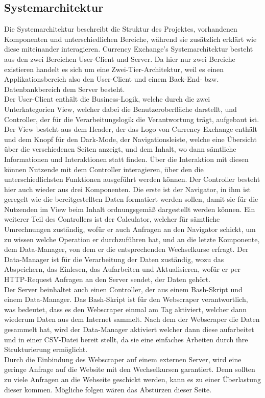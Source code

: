 \documentclass[conference]{IEEEtran}
\begin{document}
\subsection{Systemarchitektur}
Die Systemarchitektur beschreibt die Struktur des Projektes, vorhandenen Komponenten und unterschiedlichen Bereiche, während sie zusätzlich erklärt wie diese miteinander interagieren. 
Currency Exchange’s Systemarchitektur besteht aus den zwei Bereichen User-Client und Server. Da hier nur zwei Bereiche existieren handelt es sich um eine Zwei-Tier-Architektur, weil es einen Applikationsbereich also den User-Client und einem Back-End- bzw. Datenbankbereich dem Server besteht.\\
Der User-Client enthält die Business-Logik, welche durch die zwei Unterkategorien View, welcher dabei die Benutzeroberfläche darstellt, und Controller, der für die Verarbeitungslogik die Verantwortung trägt, aufgebaut ist. Der View besteht aus dem Header, der das Logo von Currency Exchange enthält und dem Knopf für den Dark-Mode, der Navigationsleiste, welche eine Übersicht über die verschiedenen Seiten anzeigt, und dem Inhalt, wo dann sämtliche Informationen und Interaktionen statt finden. Über die Interaktion mit diesen können Nutzende mit dem Controller interagieren, über den die unterschiedlichsten Funktionen ausgeführt werden können. Der Controller besteht hier auch wieder aus drei Komponenten. Die erste ist der Navigator, in ihm ist geregelt wie die bereitgestellten Daten formatiert werden sollen, damit sie für die Nutzenden im View beim Inhalt ordnungsgemäß dargestellt werden können. Ein weiterer Teil des Controllers ist der Calculator, welcher für sämtliche Umrechnungen zuständig, wofür er auch Anfragen an den Navigator schickt, um zu wissen welche Operation er durchzuführen hat, und an die letzte Komponente, dem Data-Manager, von dem er die entsprechenden Wechselkurse erfragt. Der Data-Manager ist für die Verarbeitung der Daten zuständig, wozu das Abspeichern, das Einlesen, das Aufarbeiten und Aktualisieren, wofür er per HTTP-Request Anfragen an den Server sendet, der Daten gehört.\\
Der Server beinhaltet auch einen Controller, der aus einem Bash-Skript und einem Data-Manager. Das Bash-Skript ist für den Webscraper verantwortlich, was bedeutet, dass es den Webscraper einmal am Tag aktiviert, welcher dann wiederum Daten aus dem Internet sammelt. Nach dem der Webscraper die Daten gesammelt hat, wird der Data-Manager aktiviert welcher dann diese aufarbeitet und in einer CSV-Datei bereit stellt, da sie eine einfaches Arbeiten durch ihre Strukturierung ermöglicht.\\
Durch die Einbindung des Webscraper auf einem externen Server, wird eine geringe Anfrage auf die Website mit den Wechselkursen garantiert. Denn sollten zu viele Anfragen an die Webseite geschickt werden, kann es zu einer Überlastung dieser kommen. Mögliche folgen wären das Abstürzen dieser Seite.
\end{document}

